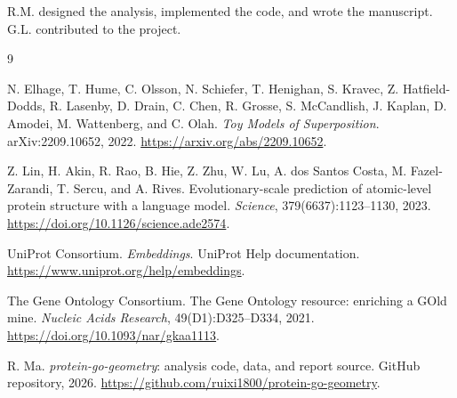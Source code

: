 \documentclass[11pt,a4paper]{article}
\begin{document}
R.M. designed the analysis, implemented the code, and wrote the manuscript. G.L.
contributed to the project.

\begin{thebibliography}{9}

N. Elhage, T. Hume, C. Olsson, N. Schiefer, T. Henighan, S. Kravec,
Z. Hatfield-Dodds, R. Lasenby, D. Drain, C. Chen, R. Grosse, S. McCandlish,
J. Kaplan, D. Amodei, M. Wattenberg, and C. Olah.
\newblock \emph{Toy Models of Superposition}.
\newblock arXiv:2209.10652, 2022.
\newblock \url{https://arxiv.org/abs/2209.10652}.

Z. Lin, H. Akin, R. Rao, B. Hie, Z. Zhu, W. Lu, A. dos Santos Costa,
M. Fazel-Zarandi, T. Sercu, and A. Rives.
\newblock Evolutionary-scale prediction of atomic-level protein structure with a
language model.
\newblock \emph{Science}, 379(6637):1123--1130, 2023.
\newblock \url{https://doi.org/10.1126/science.ade2574}.

UniProt Consortium.
\newblock \emph{Embeddings}.
\newblock UniProt Help documentation.
\newblock \url{https://www.uniprot.org/help/embeddings}.

The Gene Ontology Consortium.
\newblock The Gene Ontology resource: enriching a GOld mine.
\newblock \emph{Nucleic Acids Research}, 49(D1):D325--D334, 2021.
\newblock \url{https://doi.org/10.1093/nar/gkaa1113}.

R. Ma.
\newblock \emph{protein-go-geometry}: analysis code, data, and report source.
\newblock GitHub repository, 2026.
\newblock \url{https://github.com/ruixi1800/protein-go-geometry}.

\end{thebibliography}
\end{document}
